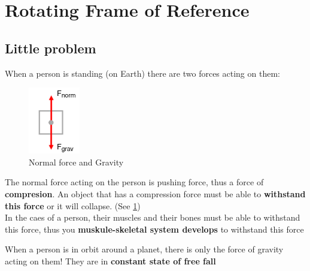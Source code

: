 \section{Rotating Frame of Reference}
\subsection{Little problem}
When a person is standing (on Earth) there are two forces acting on them:\\

\begin{paracol}{2}
    \begin{leftcolumn}
        \begin{figure} \label{fig:2.1}
        \centering
            \includegraphics[width=0.2\textwidth]{graph/FBD2.6.1.png}
        \caption{Normal force and Gravity}
        \end{figure}
        
    \end{leftcolumn}

    \begin{rightcolumn}
        The normal force acting on the person is pushing force, thus a force of \textbf{compresion}. An object 
        that has a compression force must be able to \textbf{withstand this force} or it will collapse. (See \ref{fig:2.1})\\

        In the caes of a person, their muscles and their bones must be able to withstand this force, thus you 
        \textbf{muskule-skeletal system develops} to withstand this force
    \end{rightcolumn}
\end{paracol}

When a person is in orbit around a planet, there is only the force of gravity acting on them! They are in 
\textbf{constant state of free fall} \\

